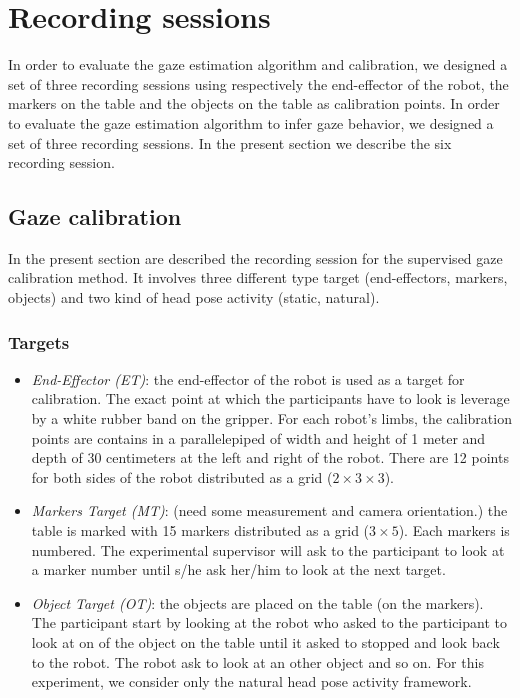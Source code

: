 \documentclass[11pt,a4paper]{article}
\begin{document}
\section{Recording sessions}
In order to evaluate the gaze estimation algorithm and calibration, we designed a set of three recording sessions using respectively the end-effector of the robot, the markers on the table and the objects on the table as calibration points. In order to evaluate the gaze estimation algorithm to infer gaze behavior, we designed a set of three recording sessions. In the present section we describe the six recording session.
\subsection{Gaze calibration}
In the present section are described the recording session for the supervised gaze calibration method. It involves three different type target (end-effectors, markers, objects) and two kind of head pose activity (static, natural).
\subsubsection{Targets}
\begin{itemize}
\item \textit{End-Effector (ET)}: the end-effector of the robot is used as a target for calibration. The exact point at which the participants have to look is leverage by a white rubber band on the gripper. For each robot's limbs, the calibration points are contains in a parallelepiped of width and height of 1 meter and depth of 30 centimeters at the left and right of the robot. There are 12 points for both sides of the robot distributed as a grid ($2 \times 3 \times 3$).
\item \textit{Markers Target (MT)}: (need some measurement and camera orientation.) the table is marked with 15 markers distributed as a grid ($3 \times 5$). Each markers is numbered. The experimental supervisor will ask to the participant to look at a marker number until s/he ask her/him to look at the next target.
\item \textit{Object Target (OT)}: the objects are placed on the table (on the markers). The participant start by looking at the robot who asked to the participant to look at on of the object on the table until it asked to stopped and look back to the robot. The robot ask to look at an other object and so on. For this experiment, we consider only the natural head pose activity framework.
\end{itemize}
\end{document}
